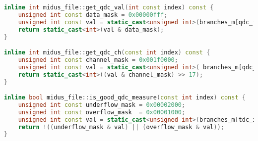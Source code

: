 \documentclass[]{article}
\begin{document}
\begin{lstlisting}[caption={Functions used for de-serialising CAEN V792N \ref{REF FOR THE DATA SHEET} QDC, written in C++}, language=C++, float=htbp]
inline int midus_file::get_qdc_val(int const index) const {
	unsigned int const data_mask = 0x00000fff;
	unsigned int const val = static_cast<unsigned int>(branches_m[qdc_i].data[index]);
	return static_cast<int>(val & data_mask); 
}

inline int midus_file::get_qdc_ch(const int index) const {
    unsigned int const channel_mask = 0x001f0000;
    unsigned int const val = static_cast<unsigned int>( branches_m[qdc_i].data[index]);
    return static_cast<int>((val & channel_mask) >> 17);
}

inline bool midus_file::is_good_qdc_measure(const int index) const {
    unsigned int const underflow_mask = 0x00002000;
    unsigned int const overflow_mask  = 0x00001000;
    unsigned int const val = static_cast<unsigned int>(branches_m[tdc_i].data[index]);
    return !((underflow_mask & val) || (overflow_mask & val));
}
\end{lstlisting}



\end{document}
